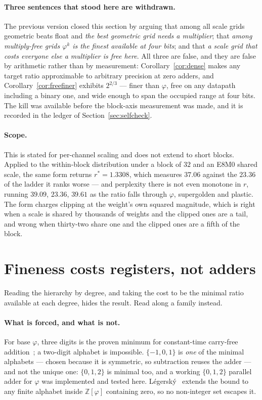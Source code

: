 \documentclass[11pt]{article}
\theoremstyle{definition}
\begin{document}
\paragraph{Three sentences that stood here are withdrawn.} The previous version
closed this section by arguing that among all scale grids geometric beats
float and \emph{the best geometric grid needs a multiplier}; that \emph{among
multiply-free grids $\varphi^{k}$ is the finest available at four bits}; and that
\emph{a scale grid that costs everyone else a multiplier is free here}. All three
are false, and they are false by arithmetic rather than by measurement:
Corollary~\ref{cor:dense} makes any target ratio approximable to arbitrary
precision at zero adders, and Corollary~\ref{cor:freefiner} exhibits $2^{2/3}$
--- finer than $\varphi$, free on any datapath including a binary one, and wide
enough to span the occupied range at four bits. The kill was available before the
block-axis measurement was made, and it is recorded in the ledger of
Section~\ref{sec:selfcheck}.

\paragraph{Scope.} This is stated for per-channel scaling and does not extend to
short blocks. Applied to the within-block distribution under a block of $32$ and
an E8M0 shared scale, the same form returns $r^{*}=1.3308$, which measures
$37.06$ against the $23.36$ of the ladder it ranks worse --- and perplexity
there is not even monotone in $r$, running $39.09$, $23.36$, $39.61$ as the
ratio falls through $\varphi$, supergolden and plastic. The form charges
clipping at the weight's own squared magnitude, which is right when a scale is
shared by thousands of weights and the clipped ones are a tail, and wrong when
thirty-two share one and the clipped ones are a fifth of the block.

\section{Fineness costs registers, not adders}\label{sec:oneadder}

Reading the hierarchy by degree, and taking the cost to be the minimal ratio
available at each degree, hides the result. Read along a family instead.

\paragraph{What is forced, and what is not.} For base $\varphi$, three digits is
the proven minimum for constant-time carry-free addition~\cite{frougny2011,
frougny2013}; a two-digit alphabet is impossible. $\{-1,0,1\}$ is \emph{one} of
the minimal alphabets --- chosen because it is symmetric, so subtraction reuses
the adder --- and not the unique one: $\{0,1,2\}$ is minimal too, and a working
$\{0,1,2\}$ parallel adder for $\varphi$ was implemented and tested here.
L\'egersk\'y~\cite{legersky2018} extends the bound to any finite alphabet inside
$\mathbb{Z}[\varphi]$ containing zero, so no non-integer set escapes it.
\end{document}
